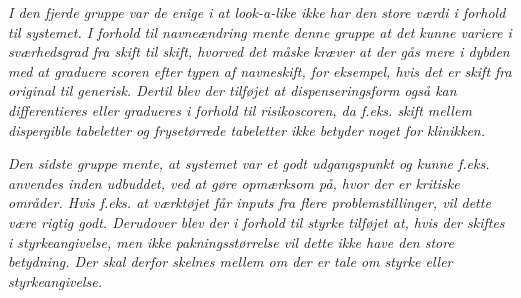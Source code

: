 \textit{I den fjerde gruppe var de enige i at look-a-like ikke har den store værdi i forhold til systemet. I forhold til navneændring mente denne gruppe at det kunne variere i sværhedsgrad fra skift til skift, hvorved det måske kræver at der gås mere i dybden med at graduere scoren efter typen af navneskift, for eksempel, hvis det er skift fra original til generisk. Dertil blev der tilføjet at dispenseringsform også kan differentieres eller gradueres i forhold til risikoscoren, da f.eks. skift mellem dispergible tabeletter og frysetørrede tabeletter ikke betyder noget for klinikken.}

\textit{
Den sidste gruppe mente, at systemet var et godt udgangspunkt og kunne f.eks. anvendes inden udbuddet, ved at gøre opmærksom på, hvor der er kritiske områder. Hvis f.eks. at værktøjet får inputs fra flere problemstillinger, vil dette være rigtig godt. Derudover blev der i forhold til styrke tilføjet at, hvis der skiftes i styrkeangivelse, men ikke pakningsstørrelse vil dette ikke have den store betydning. Der skal derfor skelnes mellem om der er tale om styrke eller styrkeangivelse.}